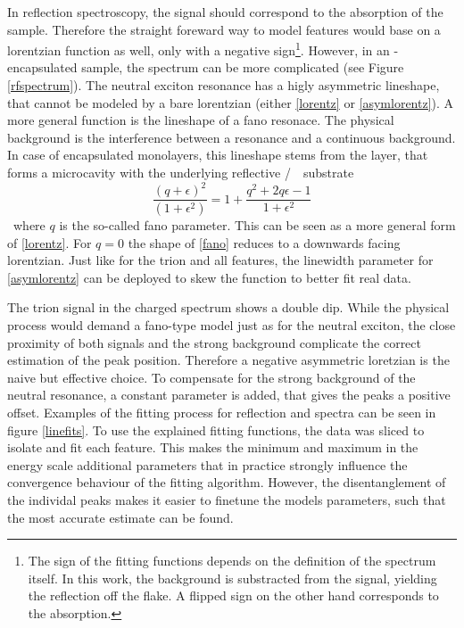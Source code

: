 In reflection spectroscopy, the signal should correspond to the absorption of the sample. Therefore the straight foreward way to model features would base on a lorentzian function as well, only with a negative sign\footnote{The sign of the fitting functions depends on the definition of the spectrum itself. In this work, the background is substracted from the signal, yielding the reflection off the flake. A flipped sign on the other hand corresponds to the absorption.}. However, in an \hbn-encapsulated sample, the spectrum can be more complicated (see Figure \ref{rfspectrum}). The neutral exciton resonance has a higly asymmetric lineshape, that cannot be modeled by a bare lorentzian (either \eqref{lorentz} or \eqref{asymlorentz}). A more general function is the lineshape of a fano resonace. The physical background is the interference between a resonance and a continuous background\cite{fano_effects_1961}. In case of encapsulated \tmdg monolayers, this lineshape stems from the \hbng layer, that forms a microcavity with the underlying reflective \si/\sio substrate\cite{scuri_large_2018}.
\begin{equation}
\frac{(q+\epsilon)^2}{(1+\epsilon^2)} = 1 + \frac{q^2+2q\epsilon-1}{1+\epsilon^2}\label{fano}
\end{equation}
where $q$ is the so-called fano parameter. This can be seen as a more general form of \eqref{lorentz}. For $q=0$ the shape of \eqref{fano} reduces to a downwards facing lorentzian. Just like for the trion and all \pl features, the linewidth parameter for \eqref{asymlorentz} can be deployed to skew the function to better fit real data.

The trion signal in the charged spectrum shows a double dip. While the physical process would demand a fano-type model just as for the neutral exciton, the close proximity of both signals and the strong background complicate the correct estimation of the peak position. Therefore a negative asymmetric loretzian is the naive but effective choice. To compensate for the strong background of the neutral resonance, a constant parameter is added, that gives the peaks a positive offset. 
Examples of the fitting process for reflection and \pl spectra can be seen in figure \ref{linefits}. To use the explained fitting functions, the data was sliced to isolate and fit each feature. This makes the minimum and maximum in the energy scale additional parameters that in practice strongly influence the convergence behaviour of the fitting algorithm. However, the disentanglement of the individal peaks makes it easier to finetune the models parameters, such that the most accurate estimate can be found.

